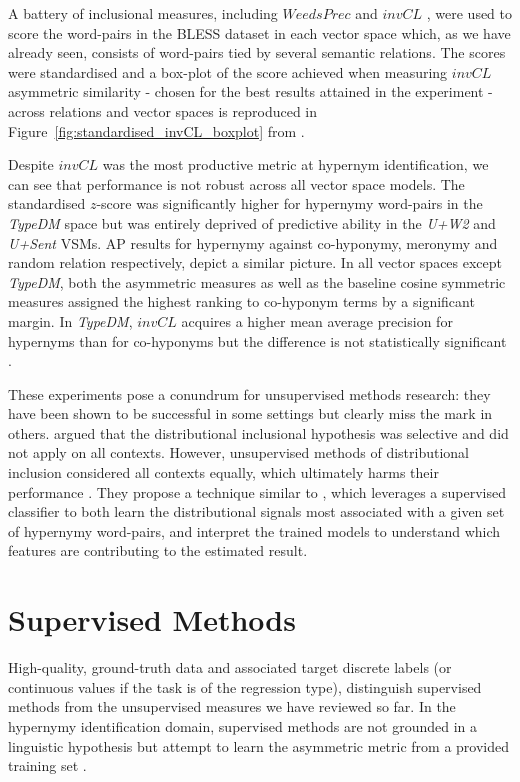 A battery of inclusional measures, including $WeedsPrec$ \citep{weeds2003general} and $invCL$ \citep{lenci2012identifying}, were used to score the word-pairs in the BLESS dataset \citep{Baroni2011} in each vector space which, as we have already seen, consists of word-pairs tied by several semantic relations.  The scores were standardised and a box-plot of the score achieved when measuring $invCL$ asymmetric similarity - chosen for the best results attained in the experiment - across relations and vector spaces is reproduced in Figure~\ref{fig:standardised_invCL_boxplot} from \citet{roller2014inclusive}.

Despite $invCL$ was the most productive metric at hypernym identification, we can see that performance is not robust across all vector space models.  The standardised $z$-score was significantly higher for hypernymy word-pairs in the \textit{TypeDM} space but was entirely deprived of predictive ability in the \textit{U+W2}  and \textit{U+Sent} \ac{VSM}s. \ac{AP} results for hypernymy against co-hyponymy, meronymy and random relation respectively, depict a similar picture.  In all vector spaces except \textit{TypeDM}, both the asymmetric measures as well as the baseline cosine symmetric measures assigned the highest ranking to co-hyponym terms by a significant margin.  In \textit{TypeDM}, $invCL$ acquires a higher mean average precision for hypernyms than for co-hyponyms but the difference is not statistically significant \citep{roller2014inclusive}.

These experiments pose a conundrum for unsupervised methods research: they have been shown to be successful in some settings but clearly miss the mark in others.  \citeauthor{roller2014inclusive} argued that the distributional inclusional hypothesis was selective and did not apply on all contexts.  However, unsupervised methods of distributional inclusion considered all contexts equally, which ultimately harms their performance \citep{roller2014inclusive}.  They propose a technique similar to \citep{Snow2004}, which leverages a supervised classifier to both learn the distributional signals most associated with a given set of hypernymy word-pairs, and interpret the trained models to understand which features are contributing to the estimated result.

\section{Supervised Methods}
High-quality, ground-truth data and associated target discrete labels (or continuous values if the task is of the regression type), distinguish supervised methods from the unsupervised measures we have reviewed so far.  In the hypernymy identification domain, supervised methods are not grounded in a linguistic hypothesis but attempt to learn the asymmetric metric from a provided training set \citep{levy2015supervised}.

